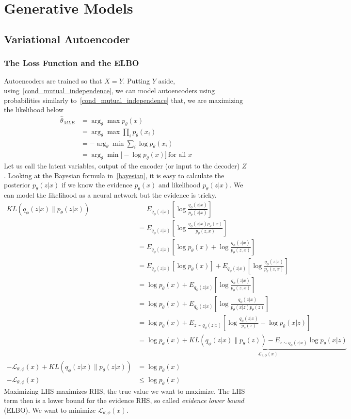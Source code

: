 \documentclass{article}
\numberwithin{equation}{subsection}
\begin{document}
\section{Generative Models}
\subsection{Variational Autoencoder}
\subsubsection{The Loss Function and the ELBO}
\label{vae_elbo}
Autoencoders are trained so that $X=Y$. Putting $Y$ aside, using~\ref{cond_mutual_independence}, we can model autoencoders using probabilities similarly to~\ref{cond_mutual_independence} that, we are maximizing the likelihood below
\begin{align}
    \hat{\theta}_{MLE} &= \arg_\theta\max p_\theta(x)\\ 
    &= \arg_\theta\max\prod_i p_\theta(x_i)\\
    &= -\arg_\theta\min\sum_i \log p_\theta(x_i)\\
    &= \arg_\theta\min\big[-\log p_\theta(x)\big]\ \text{for all $x$}
\end{align}
Let us call the latent variables, output of the encoder (or input to the decoder) $Z$. Looking at the Bayesian formula in~\ref{bayesian}, it is easy to calculate the posterior $p_\theta(z|x)$ if we know the evidence $p_\theta(x)$ and likelihood $p_\theta(z|x)$. We can model the likelihood as a neural network but the evidence is tricky.
\begin{align}
KL(q_\phi(z|x) \parallel p_\theta(z|x))
&=E_{q_\phi(z|x)}\left[ \log\frac{q_\phi(z|x)}{p_\theta(z|x)}\right]\\
&=E_{q_\phi(z|x)}\left[ \log\frac{q_\phi(z|x)p_\theta(x)}{p_\theta(z,x)}\right]\\
&=E_{q_\phi(z|x)}\left[ \log p_\theta(x) + \log\frac{q_\phi(z|x)}{p_\theta(z,x)}\right]\\
&=E_{q_\phi(z|x)}\left[\log p_\theta(x)\right] + E_{q_\phi(z|x)}\left[\log\frac{q_\phi(z|x)}{p_\theta(z,x)}\right]\\
&=\log p_\theta(x) + E_{q_\phi(z|x)}\left[\log\frac{q_\phi(z|x)}{p_\theta(z,x)}\right]\\
&=\log p_\theta(x) + E_{q_\phi(z|x)}\left[\log\frac{q_\phi(z|x)}{p_\theta(x|z)p_\theta(z)}\right]\\
&=\log p_\theta(x) + E_{z\sim q_\phi(z|x)}\left[\log \frac{q_\phi(z|x)}{p_\theta(z)} - \log p_\theta(x| z)\right]\\
&=\log p_\theta(x) + \underbrace{KL(q_\phi(z|x) \parallel p_\theta(z)) - E_{z\sim q_\phi(z|x)}\log p_\theta(x|z)}_{\mathcal{L}_{\theta, \phi}(x)}\\
-\mathcal{L}_{\theta, \phi}(x)+KL(q_\phi(z|x) \parallel p_\theta(z|x)) &= \log p_\theta(x)\\
-\mathcal{L}_{\theta, \phi}(x) &\leq \log p_\theta(x) 
\end{align}
Maximizing LHS maximizes RHS, the true value we want to maximize. The LHS term then is a lower bound for the evidence RHS, so called \textit{evidence lower bound} (ELBO). We want to minimize $\mathcal{L}_{\theta, \phi}(x)$.
\end{document}
